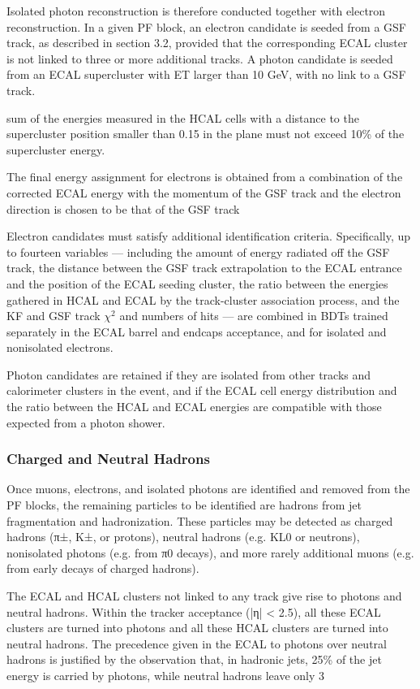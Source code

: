 Isolated photon reconstruction is therefore conducted together with electron reconstruction. In a given PF block, an electron candidate is seeded from a GSF track, as described in section 3.2, provided that the corresponding ECAL cluster is not linked to three or more additional tracks. A photon candidate is seeded from an ECAL supercluster with ET larger than 10 GeV, with no link to a GSF track.

sum of the energies measured in the HCAL cells with a distance to the supercluster position smaller than 0.15 in the \etaphi plane must not exceed 10\% of the supercluster energy.

The final energy assignment for electrons is obtained from a combination of the corrected ECAL energy with the momentum of the GSF track and the electron direction is chosen to be that of the GSF track

Electron candidates must satisfy additional identification criteria. Specifically, up to fourteen variables — including the amount of energy radiated off the GSF track, the distance between the GSF track extrapolation to the ECAL entrance and the position of the ECAL seeding cluster, the ratio between the energies gathered in HCAL and ECAL by the track-cluster association process, and the KF and GSF track $\chi^2$ and numbers of hits — are combined in BDTs trained separately in the ECAL barrel and endcaps acceptance, and for isolated and nonisolated electrons.

Photon candidates are retained if they are isolated from other tracks and calorimeter clusters in the event, and if the ECAL cell energy distribution and the ratio between the HCAL and ECAL energies are compatible with those expected from a photon shower.



\subsubsection{Charged and Neutral Hadrons}

Once muons, electrons, and isolated photons are identified and removed from the PF blocks, the remaining particles to be identified are hadrons from jet fragmentation and hadronization. These particles may be detected as charged hadrons (π±, K±, or protons), neutral hadrons (e.g. KL0 or neutrons), nonisolated photons (e.g. from π0 decays), and more rarely additional muons (e.g. from early decays of charged hadrons).

The ECAL and HCAL clusters not linked to any track give rise to photons and neutral hadrons. Within the tracker acceptance (|η| < 2.5), all these ECAL clusters are turned into photons and all these HCAL clusters are turned into neutral hadrons. The precedence given in the ECAL to photons over neutral hadrons is justified by the observation that, in hadronic jets, 25\% of the jet energy is carried by photons, while neutral hadrons leave only 3%

